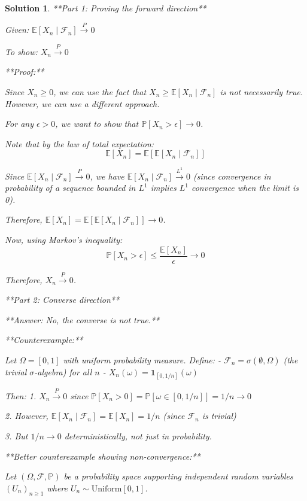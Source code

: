 \documentclass[12pt]{amsart}
\newtheorem*{solution}{Solution}
\begin{document}
\begin{solution}
**Part 1: Proving the forward direction**

Given: $\mathbb{E}[X_n \mid \mathcal{F}_n] \xrightarrow{P} 0$

To show: $X_n \xrightarrow{P} 0$

**Proof:** 

Since $X_n \geq 0$, we can use the fact that $X_n \geq \mathbb{E}[X_n \mid \mathcal{F}_n]$ is not necessarily true. However, we can use a different approach.

For any $\epsilon > 0$, we want to show that $\mathbb{P}[X_n > \epsilon] \to 0$.

Note that by the law of total expectation:
$$\mathbb{E}[X_n] = \mathbb{E}[\mathbb{E}[X_n \mid \mathcal{F}_n]]$$

Since $\mathbb{E}[X_n \mid \mathcal{F}_n] \xrightarrow{P} 0$, we have $\mathbb{E}[X_n \mid \mathcal{F}_n] \xrightarrow{L^1} 0$ (since convergence in probability of a sequence bounded in $L^1$ implies $L^1$ convergence when the limit is 0).

Therefore, $\mathbb{E}[X_n] = \mathbb{E}[\mathbb{E}[X_n \mid \mathcal{F}_n]] \to 0$.

Now, using Markov's inequality:
$$\mathbb{P}[X_n > \epsilon] \leq \frac{\mathbb{E}[X_n]}{\epsilon} \to 0$$

Therefore, $X_n \xrightarrow{P} 0$.

**Part 2: Converse direction**

**Answer: No, the converse is not true.**

**Counterexample:**

Let $\Omega = [0,1]$ with uniform probability measure. Define:
- $\mathcal{F}_n = \sigma(\emptyset, \Omega)$ (the trivial $\sigma$-algebra) for all $n$
- $X_n(\omega) = \mathbf{1}_{[0, 1/n]}(\omega)$

Then:
1. $X_n \xrightarrow{P} 0$ since $\mathbb{P}[X_n > 0] = \mathbb{P}[\omega \in [0, 1/n]] = 1/n \to 0$

2. However, $\mathbb{E}[X_n \mid \mathcal{F}_n] = \mathbb{E}[X_n] = 1/n$ (since $\mathcal{F}_n$ is trivial)

3. But $1/n \to 0$ deterministically, not just in probability.

**Better counterexample showing non-convergence:**

Let $(\Omega, \mathcal{F}, \mathbb{P})$ be a probability space supporting independent random variables $(U_n)_{n \geq 1}$ where $U_n \sim \text{Uniform}[0,1]$.


\end{solution}
\end{document}
